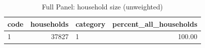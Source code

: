 \begin{table}
\caption{Full Panel: household size (unweighted)}
\begin{tabular}{lrlr}
\toprule
code & households & category & percent\_all\_households \\
\midrule
1 & 37827 & 1 & 100.00 \\
\bottomrule
\end{tabular}
\end{table}
